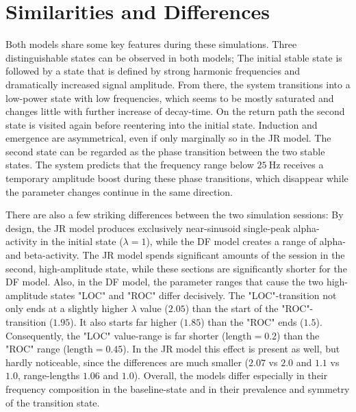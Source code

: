 \section{Similarities and Differences}
    Both models share some key features during these simulations.
    Three distinguishable states can be observed in both models;
    The initial stable state is followed by a state that is defined by strong harmonic frequencies and dramatically
    increased signal amplitude.
    From there, the system transitions into a low-power state with low frequencies,
    which seems to be mostly saturated and changes little with further increase of decay-time.
    On the return path the second state is visited again before reentering into the initial state.
    Induction and emergence are asymmetrical, even if only marginally so in the JR model.
    The second state can be regarded as the phase transition between the two stable states.
    The system predicts that the frequency range below $\SI{25}{\hertz}$ receives a temporary amplitude boost during
    these phase transitions, which disappear while the parameter changes continue in the same direction.


There are also a few striking differences between the two simulation sessions:
By design,
the JR model produces exclusively near-sinusoid single-peak alpha-activity in the initial state ($\lambda = 1$),
while the DF model creates a range of alpha- and beta-activity.
The JR model spends significant amounts of the session in the second, high-amplitude state,
while these sections are significantly shorter for the DF model.
Also, in the DF model,
the parameter ranges that cause the two high-amplitude states "LOC" and "ROC" differ decisively.
The "LOC"-transition not only ends at a slightly higher $\lambda$ value ($2.05$) than the start of the
"ROC"-transition ($1.95$).
It also starts far higher ($1.85$) than the "ROC" ends ($1.5$).
Consequently, the "LOC" value-range is far shorter ($\text{length}=0.2$) than the "ROC" range
($\text{length}=0.45$).
In the JR model this effect is present as well, but hardly noticeable,
since the differences are much smaller ($2.07$ vs $2.0$ and $1.1$ vs $1.0$, range-lengths $1.06$ and $1.0$).
Overall, the models differ especially in their frequency composition in the baseline-state
and in their prevalence and symmetry of the transition state.